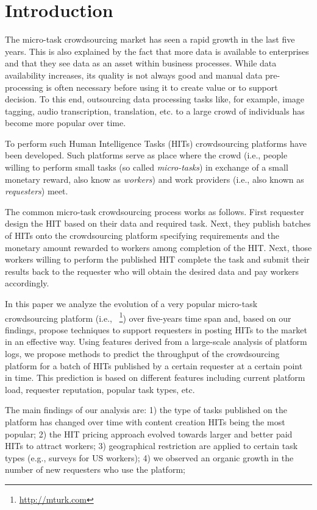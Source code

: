 \section{Introduction}\label{sec:intro}
The micro-task crowdsourcing market has seen a rapid growth in the last five years. This is also explained by the fact that more data is available to enterprises and that they see data as an asset within business processes.
% 
While data  availability increases, its quality is not always good and manual data pre-processing is often necessary before using it to create value or to support decision.
% 
To this end, outsourcing  data processing tasks  like, for example, image tagging, audio transcription, translation, etc. to a large crowd of individuals has become more popular over time.

To perform such Human Intelligence Tasks (HITs) crowdsourcing platforms have been developed. Such platforms serve as place where the crowd (i.e., people willing to perform small tasks (so called \emph{micro-tasks}) in exchange of a small monetary reward, also know as \emph{workers}) and work providers (i.e., also known as \emph{requesters}) meet. 

The common micro-task crowdsourcing process works as follows. First requester design the HIT based on their data and required task. Next, they publish batches of HITs onto the crowdsourcing platform specifying requirements and the monetary amount rewarded to workers among completion of the HIT. Next, those workers willing to perform the published HIT complete the task and submit their results back to the requester who will obtain the desired data and pay workers accordingly.

In this paper we analyze the evolution of a very popular micro-task crowdsourcing platform (i.e., \amt\ \footnote{\url{http://mturk.com}}) over  five-years time span and, based on our findings, propose techniques to support requesters in posting HITs to the market in an effective way.
% 
Using features derived from a large-scale analysis of platform logs, we propose methods to predict the throughput of the crowdsourcing platform for a batch of HITs published by a certain requester at a certain point in time. This prediction is based on different features including current platform load, requester reputation, popular task types, etc.

The main findings of our analysis are: 1) the type of tasks published on the platform has changed over time with content creation HITs being the most popular; 2) the HIT pricing approach evolved towards larger and better paid HITs to attract workers; 3) geographical restriction are applied to certain task types (e.g., surveys for US workers); 4) we observed an organic growth in the number of new requesters who use the platform; 


